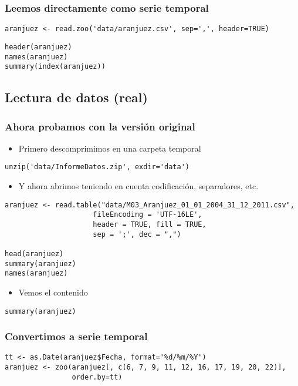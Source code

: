 \documentclass[bigger]{beamer}
\begin{document}
\begin{frame}[fragile]
\frametitle{Leemos directamente como serie temporal}
\label{sec-1-2-5}


\lstset{language=R}
\begin{lstlisting}
aranjuez <- read.zoo('data/aranjuez.csv', sep=',', header=TRUE)
\end{lstlisting}


\lstset{language=R}
\begin{lstlisting}
header(aranjuez)
names(aranjuez)
summary(index(aranjuez))
\end{lstlisting}
\end{frame}
\subsection{Lectura de datos (real)}
\label{sec-1-3}
\begin{frame}[fragile]
\frametitle{Ahora probamos con la versión original}
\label{sec-1-3-1}

\begin{itemize}
\item Primero descomprimimos en una carpeta temporal
\end{itemize}

\lstset{language=R}
\begin{lstlisting}
unzip('data/InformeDatos.zip', exdir='data')
\end{lstlisting}
\begin{itemize}
\item Y ahora abrimos teniendo en cuenta codificación, separadores, etc.
\end{itemize}

\lstset{language=R}
\begin{lstlisting}
aranjuez <- read.table("data/M03_Aranjuez_01_01_2004_31_12_2011.csv",
                     fileEncoding = 'UTF-16LE',
                     header = TRUE, fill = TRUE,
                     sep = ';', dec = ",")

head(aranjuez)
summary(aranjuez)
names(aranjuez)
\end{lstlisting}
\begin{itemize}
\item Vemos el contenido
\end{itemize}

\lstset{language=R}
\begin{lstlisting}
summary(aranjuez)
\end{lstlisting}
\end{frame}
\begin{frame}[fragile]
\frametitle{Convertimos a serie temporal}
\label{sec-1-3-2}


\lstset{language=R}
\begin{lstlisting}
tt <- as.Date(aranjuez$Fecha, format='%d/%m/%Y')
aranjuez <- zoo(aranjuez[, c(6, 7, 9, 11, 12, 16, 17, 19, 20, 22)],
                order.by=tt)
\end{lstlisting}
\end{frame}
\end{document}
